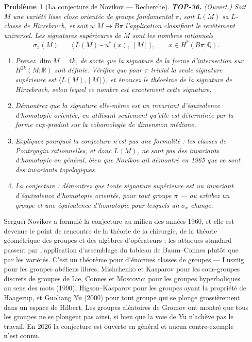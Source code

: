 \documentclass[11pt]{article}
\newtheorem{problem}{Problème}
\begin{document}
\begin{problem}[{La conjecture de Novikov --- Recherche}]
\textbf{TOP-36.} (Ouvert.) Soit $ M $ une variété lisse close orientée de groupe fondamental
$ \pi $, soit $ L(M) $ sa $ L $-classe de Hirzebruch, et soit $ u : M \to B\pi $ l'application
classifiant le revêtement universel. Les \textit{signatures supérieures} de $ M $ sont les nombres
rationnels
\[ \sigma_x(M) \;=\; \big\langle\, L(M) \smile u^*(x),\; [M] \,\big\rangle , \qquad
x \in H^*(B\pi; \mathbb{Q}) . \]
\begin{enumerate}
\item[(a)] Prenez $ \dim M = 4k $, de sorte que la signature de la forme d'intersection sur
$ H^{2k}(M;\mathbb{R}) $ soit définie. Vérifiez que pour $ \pi $ trivial la seule signature
supérieure est $ \langle L(M), [M] \rangle $, et énoncez le théorème de la signature de Hirzebruch,
selon lequel ce nombre est exactement cette signature.
\item[(b)] Démontrez que la signature elle-même est un invariant d'équivalence d'homotopie orientée, en
utilisant seulement qu'elle est déterminée par la forme cup-produit sur la cohomologie de dimension
médiane.
\item[(c)] Expliquez pourquoi la conjecture n'est pas une formalité : les classes de Pontryagin rationnelles,
et donc $ L(M) $, ne sont \textit{pas} des invariants d'homotopie en général, bien que Novikov ait
démontré en 1965 que ce sont des invariants topologiques.
\item[(d)] La conjecture : démontrez que toute signature supérieure est un invariant d'équivalence d'homotopie
orientée, pour tout groupe $ \pi $ --- ou exhibez un groupe et une équivalence d'homotopie pour
lesquels un $ \sigma_x $ change.
\end{enumerate}

\end{problem}

\noindent Sergueï Novikov a formulé la conjecture au milieu des années 1960, et elle est devenue
le point de rencontre de la théorie de la chirurgie, de la théorie géométrique des groupes et des algèbres
d'opérateurs : les attaques standard passent par l'application d'assemblage du tableau de Baum--Connes
plutôt que par les variétés. C'est un théorème pour d'énormes classes de groupes --- Lusztig pour les groupes
abéliens libres, Mishchenko et Kasparov pour les sous-groupes discrets de groupes de Lie, Connes et
Moscovici pour les groupes hyperboliques au sens des mots (1990), Higson--Kasparov pour les groupes ayant la
propriété de Haagerup, et Guoliang Yu (2000) pour tout groupe qui se plonge grossièrement dans un espace de
Hilbert. Les groupes aléatoires de Gromov ont montré que tous les groupes ne se plongent pas ainsi, si bien
que la voie de Yu n'achève pas le travail. En 2026 la conjecture est ouverte en général et aucun
contre-exemple n'est connu.
\end{document}
